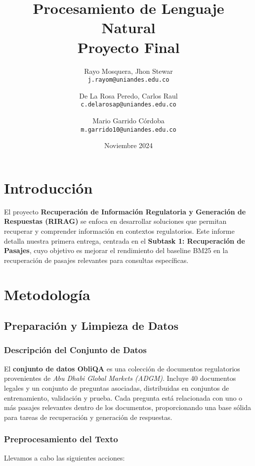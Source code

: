 \documentclass[11pt,english]{article}
\title{Procesamiento de Lenguaje Natural\\
Proyecto Final
}
\author{
  Rayo Mosquera, Jhon Stewar\\
  \texttt{j.rayom@uniandes.edu.co}
  \and
  De La Rosa Peredo, Carlos Raul\\
  \texttt{c.delarosap@uniandes.edu.co}\and
  Mario Garrido Córdoba\\
   \texttt{m.garrido10@uniandes.edu.co}
  \\ 
}
\date{Noviembre 2024}
\theoremstyle{plain}
\begin{document}
\maketitle

\section{Introducción}

El proyecto \textbf{Recuperación de Información Regulatoria y Generación de Respuestas (RIRAG)} se enfoca en desarrollar soluciones que permitan recuperar y comprender información en contextos regulatorios. Este informe detalla nuestra primera entrega, centrada en el \textbf{Subtask 1: Recuperación de Pasajes}, cuyo objetivo es mejorar el rendimiento del baseline BM25 en la recuperación de pasajes relevantes para consultas específicas.

\section{Metodología}

\subsection{Preparación y Limpieza de Datos}

\subsubsection{Descripción del Conjunto de Datos}

El \textbf{conjunto de datos ObliQA} es una colección de documentos regulatorios provenientes de \textit{Abu Dhabi Global Markets (ADGM)}. Incluye 40 documentos legales y un conjunto de preguntas asociadas, distribuidas en conjuntos de entrenamiento, validación y prueba. Cada pregunta está relacionada con uno o más pasajes relevantes dentro de los documentos, proporcionando una base sólida para tareas de recuperación y generación de respuestas.

\subsubsection{Preprocesamiento del Texto}

Llevamos a cabo las siguientes acciones:
\end{document}
